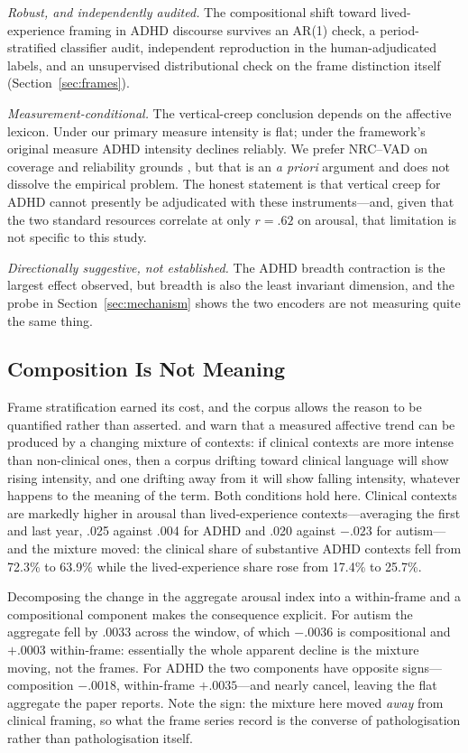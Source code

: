\documentclass[final]{clv2025}
\begin{document}
\emph{Robust, and independently audited.} The compositional shift toward lived-experience
framing in ADHD discourse survives an AR(1) check, a period-stratified classifier audit,
independent reproduction in the human-adjudicated labels, and an unsupervised distributional
check on the frame distinction itself (Section~\ref{sec:frames}).

\emph{Measurement-conditional.} The vertical-creep conclusion depends on the affective
lexicon. Under our primary measure intensity is flat; under the framework's original measure
ADHD intensity declines reliably. We prefer NRC--VAD on coverage and reliability grounds
\citep{mohammadNRCVADLexicon2025}, but that is an \emph{a priori} argument and does not
dissolve the empirical problem. The honest statement is that vertical creep for ADHD cannot
presently be adjudicated with these instruments---and, given that the two standard resources
correlate at only $r = .62$ on arousal, that limitation is not specific to this study.

\emph{Directionally suggestive, not established.} The ADHD breadth contraction is the
largest effect observed, but breadth is also the least invariant dimension, and the probe in
Section~\ref{sec:mechanism} shows the two encoders are not measuring quite the same thing.

\subsection{Composition Is Not Meaning}

Frame stratification earned its cost, and the corpus allows the reason to be quantified
rather than asserted. \citet{pislRevisitingSemanticSeverity2025} and
\citet{xiaoHaveConceptsAnxiety2023} warn that a measured affective trend can be produced by
a changing mixture of contexts: if clinical contexts are more intense than non-clinical
ones, then a corpus drifting toward clinical language will show rising intensity, and one
drifting away from it will show falling intensity, whatever happens to the meaning of the
term. Both conditions hold here. Clinical contexts are markedly higher in arousal than
lived-experience contexts---averaging the first and last year, .025 against .004 for ADHD
and .020 against $-.023$ for autism---and the mixture moved: the clinical share of
substantive ADHD contexts fell from 72.3\% to 63.9\% while the lived-experience share rose
from 17.4\% to 25.7\%.

Decomposing the change in the aggregate arousal index into a within-frame and a
compositional component makes the consequence explicit. For autism the aggregate fell by
.0033 across the window, of which $-.0036$ is compositional and $+.0003$ within-frame:
essentially the whole apparent decline is the mixture moving, not the frames. For ADHD the
two components have opposite signs---composition $-.0018$, within-frame $+.0035$---and
nearly cancel, leaving the flat aggregate the paper reports. Note the sign: the mixture
here moved \emph{away} from clinical framing, so what the frame series record is the
converse of pathologisation rather than pathologisation itself.
\end{document}
